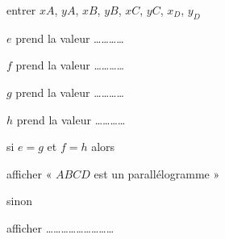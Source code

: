
\begin{exercice}\label{exosmath-0578}

\begin{fmpage}{0.9\linewidth}

    entrer \( xA\), \( yA\), \( xB\), \( yB\), \( xC\), \( yC\), \( x_D\), \( y_D\)

    \( e\) prend la valeur \ldots\ldots\ldots\ldots

    \( f\) prend la valeur \ldots\ldots\ldots\ldots
 
    \( g\) prend la valeur \ldots\ldots\ldots\ldots
    
    \( h\) prend la valeur \ldots\ldots\ldots\ldots

    si \( e=g\) et \( f=h\)   alors

    \hspace{0.7cm} afficher « \( ABCD\) est un parallélogramme » 

    sinon

    \hspace{0.7cm} afficher \ldots\ldots\ldots\ldots\ldots\ldots\ldots\ldots\ldots

\end{fmpage}


\end{exercice}
